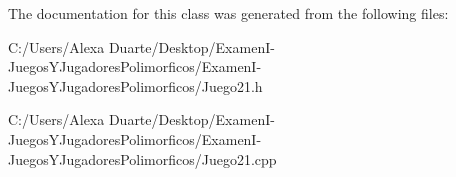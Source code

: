 The documentation for this class was generated from the following files\+:\begin{DoxyCompactItemize}
\item 
C\+:/\+Users/\+Alexa Duarte/\+Desktop/\+Examen\+I-\/\+Juegos\+Y\+Jugadores\+Polimorficos/\+Examen\+I-\/\+Juegos\+Y\+Jugadores\+Polimorficos/Juego21.\+h\item 
C\+:/\+Users/\+Alexa Duarte/\+Desktop/\+Examen\+I-\/\+Juegos\+Y\+Jugadores\+Polimorficos/\+Examen\+I-\/\+Juegos\+Y\+Jugadores\+Polimorficos/Juego21.\+cpp\end{DoxyCompactItemize}
